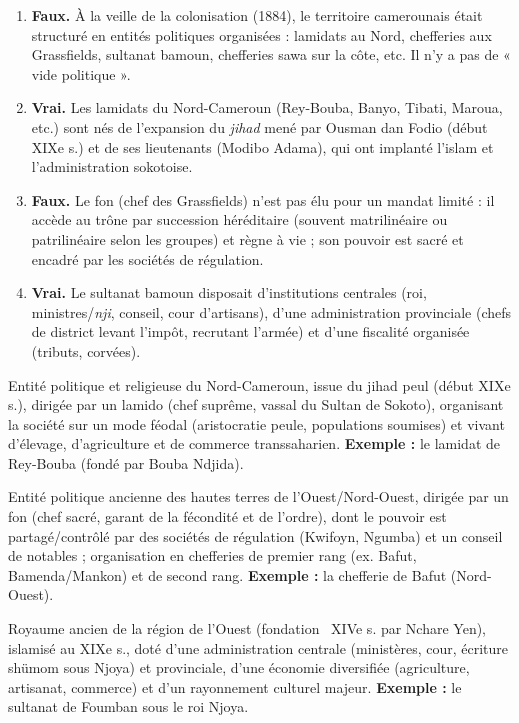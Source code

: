 \documentclass[11pt]{article}
\newcommand{\cle}[1]{{\popxbold\color{popdark}#1}}
\begin{document}
\begin{corrige}
\begin{enumerate}
\item \textbf{Faux.} À la veille de la colonisation (1884), le territoire camerounais était structuré en entités politiques organisées : lamidats au Nord, chefferies aux Grassfields, sultanat bamoun, chefferies sawa sur la côte, etc. Il n'y a pas de « vide politique ».
\item \textbf{Vrai.} Les lamidats du Nord-Cameroun (Rey-Bouba, Banyo, Tibati, Maroua, etc.) sont nés de l'expansion du \emph{jihad} mené par Ousman dan Fodio (début XIXe s.) et de ses lieutenants (Modibo Adama), qui ont implanté l'islam et l'administration sokotoise.
\item \textbf{Faux.} Le \cle{fon} (chef des Grassfields) n'est pas élu pour un mandat limité : il accède au trône par succession héréditaire (souvent matrilinéaire ou patrilinéaire selon les groupes) et règne à vie ; son pouvoir est sacré et encadré par les sociétés de régulation.
\item \textbf{Vrai.} Le sultanat bamoun disposait d'institutions centrales (roi, ministres/\emph{nji}, conseil, cour d'artisans), d'une administration provinciale (chefs de district levant l'impôt, recrutant l'armée) et d'une fiscalité organisée (tributs, corvées).
\end{enumerate}
\end{corrige}

\begin{corrige}
\begin{definition}[Lamidat]
Entité politique et religieuse du Nord-Cameroun, issue du jihad peul (début XIXe s.), dirigée par un \cle{lamido} (chef suprême, vassal du Sultan de Sokoto), organisant la société sur un mode féodal (aristocratie peule, populations soumises) et vivant d'élevage, d'agriculture et de commerce transsaharien. \textbf{Exemple :} le lamidat de \cle{Rey-Bouba} (fondé par Bouba Ndjida).
\end{definition}

\begin{definition}
Entité politique ancienne des hautes terres de l'Ouest/Nord-Ouest, dirigée par un \cle{fon} (chef sacré, garant de la fécondité et de l'ordre), dont le pouvoir est partagé/contrôlé par des sociétés de régulation (Kwifoyn, Ngumba) et un conseil de notables ; organisation en chefferies de premier rang (ex. Bafut, Bamenda/Mankon) et de second rang. \textbf{Exemple :} la chefferie de \cle{Bafut} (Nord-Ouest).
\end{definition}

\begin{definition}
Royaume ancien de la région de l'Ouest (fondation ~XIVe s. par Nchare Yen), islamisé au XIXe s., doté d'une administration centrale (ministères, cour, écriture shümom sous Njoya) et provinciale, d'une économie diversifiée (agriculture, artisanat, commerce) et d'un rayonnement culturel majeur. \textbf{Exemple :} le sultanat de \cle{Foumban} sous le roi Njoya.
\end{definition}
\end{corrige}
\end{document}
